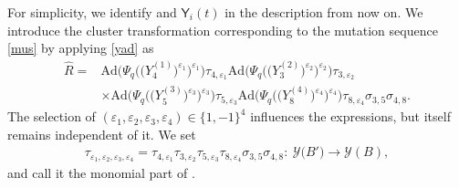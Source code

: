 \documentclass[pdftex]{sigma}
\newcommand\rY{{\mathsf{Y}}}
\numberwithin{equation}{section}
\begin{document}
For simplicity, we identify  and $\rY_i(t)$ in the
description from now on. We introduce the cluster transformation
corresponding to the mutation sequence \eqref{mus} by applying
\eqref{yad} as
\begin{align}
\widehat{R} ={}&
\mathrm{Ad}\bigl(\Psi_q\bigl(\bigl(Y^{(1)}_4\bigr)^{\varepsilon_1}\bigr)^{\varepsilon_1}\bigr)\tau_{4,\varepsilon_1}
\mathrm{Ad}\bigl(\Psi_q\bigl(\bigl(Y^{(2)}_3\bigr)^{\varepsilon_2}\bigr)^{\varepsilon_2}\bigr)\tau_{3,\varepsilon_2}\nonumber
\\
 & \times
\mathrm{Ad}\bigl(\Psi_q\bigl(\bigl(Y^{(3)}_5\bigr)^{\varepsilon_3}\bigr)^{\varepsilon_3}\bigr)\tau_{5,\varepsilon_3}
\mathrm{Ad}\bigl(\Psi_q\bigl(\bigl(Y^{(4)}_8\bigr)^{\varepsilon_4}\bigr)^{\varepsilon_4}\bigr)\tau_{8,\varepsilon_4}
\sigma_{3,5}\sigma_{4,8}.\label{rhat}
\end{align}
The selection of $(\varepsilon_1, \varepsilon_2, \varepsilon_3, \varepsilon_4) \in \{1,-1\}^4$
influences the expressions, but  itself remains independent of it.
We set
\begin{align}\label{taue}
\tau_{\varepsilon_1, \varepsilon_2, \varepsilon_3, \varepsilon_4} =
\tau_{4,\varepsilon_1}
\tau_{3,\varepsilon_2}
\tau_{5,\varepsilon_3}
\tau_{8,\varepsilon_4} \sigma_{3,5}\sigma_{4,8}\colon\
\mathcal{Y}\bigl(B'\bigr) \rightarrow \mathcal{Y}(B),
 \end{align}
 and call it the monomial part of .
\end{document}
